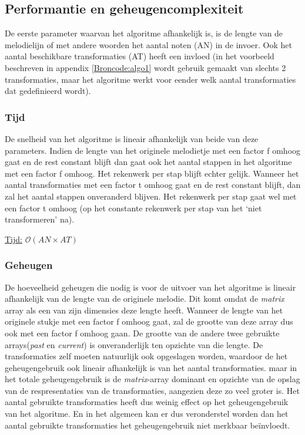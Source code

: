 \subsection{Performantie en geheugencomplexiteit}
De eerste parameter waarvan het algoritme afhankelijk is, is de lengte van de melodielijn of met andere woorden het aantal noten (AN) in de invoer. Ook het aantal beschikbare transformaties (AT) heeft een invloed (in het voorbeeld beschreven in appendix \ref{Broncode:algo1} wordt gebruik gemaakt van slechts 2 transformaties, maar het algoritme werkt voor eender welk aantal transformaties dat gedefinieerd wordt).

\subsubsection{Tijd} 
De snelheid van het algoritme is lineair afhankelijk van beide van deze parameters. Indien de lengte van het originele melodietje met een factor f omhoog gaat en de rest constant blijft dan gaat ook het aantal stappen in het algoritme met een factor f omhoog. Het rekenwerk per stap blijft echter gelijk. Wanneer het aantal transformaties met een factor t omhoog gaat en de rest constant blijft, dan zal het aantal stappen onveranderd blijven. Het rekenwerk per stap gaat wel met een factor t omhoog (op het constante rekenwerk per stap van het `niet transformeren' na).

\begin{center}
\underline{Tijd:} $\mathcal{O}(AN \times AT)$
\end{center}

\subsubsection{Geheugen}
De hoeveelheid geheugen die nodig is voor de uitvoer van het algoritme is lineair afhankelijk van de lengte van de originele melodie. Dit komt omdat de \textit{matrix} array als een van zijn dimensies deze lengte heeft. Wanneer de lengte van het originele stukje met een factor f omhoog gaat, zal de grootte van deze array dus ook met een factor f omhoog gaan. De grootte van de andere twee gebruikte arrays(\textit{past} en \textit{current}) is onveranderlijk ten opzichte van die lengte. De transformaties zelf moeten natuurlijk ook opgeslagen worden, waardoor de het geheugengebruik ook lineair afhankelijk is van het aantal transformaties. maar in het totale geheugengebruik is de \textit{matrix}-array dominant en opzichte van de opslag van de respresentaties van de transformaties, aangezien deze zo veel groter is. Het aantal gebruikte transformaties heeft dus weinig effect op het geheugengebruik van het algoritme. En in het algemeen kan er dus veronderstel worden dan het aantal gebruikte transformaties het geheugengebruik niet merkbaar be\"invloedt.

